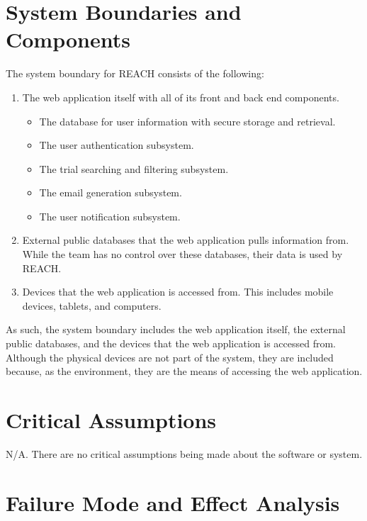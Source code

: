 \documentclass{article}
\begin{document}
\section{System Boundaries and Components}
The system boundary for REACH consists of the following:
\begin{enumerate}
    \item The web application itself with all of its front and back end components.
    \begin{itemize}
        \item The database for user information with secure storage and retrieval.
        \item The user authentication subsystem.
        \item The trial searching and filtering subsystem.
        \item The email generation subsystem.
        \item The user notification subsystem.
    \end{itemize}
    \item External public databases that the web application pulls information from. 
    While the team has no control over these databases, their data is used by REACH.
    \item Devices that the web application is accessed from.
    This includes mobile devices, tablets, and computers.
\end{enumerate}

As such, the system boundary 
includes the web application itself, the external public databases, 
and the devices that the web application is accessed from.
Although the physical devices are not part of the system, 
they are included because, as the environment, they are the means of accessing the web application.



\section{Critical Assumptions}
N/A. There are no critical assumptions being made about the software or system.

\section{Failure Mode and Effect Analysis}
    
\end{document}
